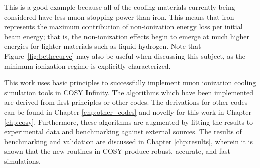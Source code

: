 This is a good example because all of the cooling materials currently being considered have less muon stopping power than iron. This means that iron represents the maximum contribution of non-ionization energy loss per initial beam energy; that is, the non-ionization effects begin to emerge at much higher energies for lighter materials such as liquid hydrogen. Note that Figure~\ref{fig:bethecurve} may also be useful when discussing this subject, as the minimum ionization regime is explicitly characterized.


This work uses basic principles to successfully implement muon ionization cooling simulation tools in COSY Infinity. The algorithms which have been implemented are derived from first principles or other codes. The derivations for other codes can be found in Chapter \ref{chp:other_codes} and novelly for this work in Chapter \ref{chp:cosy}. Furthermore, these algorithms are augmented by fitting the results to experimental data and benchmarking against external sources. The results of benchmarking and validation are discussed in Chapter \ref{chp:results}, wherein it is shown that the new routines in COSY produce robust, accurate, and fast simulations.